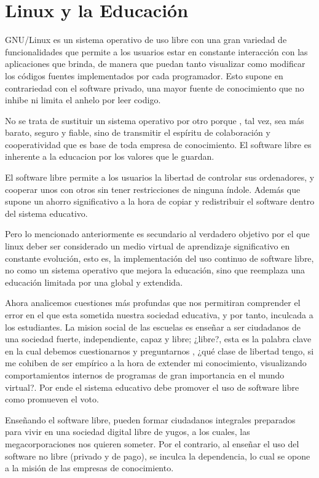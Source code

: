 \chapter*{Linux y la Educación}
GNU/Linux es un sistema operativo de uso libre con una gran
variedad de funcionalidades que permite a los usuarios estar en
constante interacción con las aplicaciones que brinda, de
manera que puedan tanto visualizar como modificar los códigos
fuentes implementados por cada programador. Esto supone en
contrariedad con el software privado, una mayor fuente de
conocimiento que no inhibe ni limita el anhelo por leer codigo.

No se trata de sustituir un sistema operativo por otro porque ,
tal vez, sea más barato, seguro y fiable, sino de transmitir el
espíritu de colaboración y cooperatividad que es base de toda
empresa de conocimiento. El software libre es inherente a la
educacion por los valores que le guardan.

El software libre permite a los usuarios la libertad de controlar
sus ordenadores, y cooperar unos con otros sin tener
restricciones de ninguna índole. Además que supone un ahorro
significativo a la hora de copiar y redistribuir el software dentro
del sistema educativo.

Pero lo mencionado anteriormente es secundario al verdadero
objetivo por el que linux deber ser considerado un medio virtual
de aprendizaje significativo en constante evolución, esto es, la
implementación del uso continuo de software libre, no como un
sistema operativo que mejora la educación, sino que reemplaza
una educación limitada por una global y extendida.

Ahora analicemos cuestiones más profundas que nos permitiran
comprender el error en el que esta sometida nuestra sociedad
educativa, y por tanto, inculcada a los estudiantes.
La mision social de las escuelas es enseñar a ser ciudadanos de
una sociedad fuerte, independiente, capaz y libre; ¿libre?, esta
es la palabra clave en la cual debemos cuestionarnos y
preguntarnos , ¿qué clase de libertad tengo, si me cohiben de
ser empírico a la hora de extender mi conocimiento, visualizando
comportamientos internos de programas de gran importancia en
el mundo virtual?. Por ende el sistema educativo debe promover
el uso de software libre como promueven el voto.

Enseñando el software libre, pueden formar ciudadanos
integrales preparados para vivir en una sociedad digital libre de
yugos, a los cuales, las megacorporaciones nos quieren someter.
Por el contrario, al enseñar el uso del software no libre (privado
y de pago), se inculca la dependencia, lo cual se opone a la
misión de las empresas de conocimiento.

